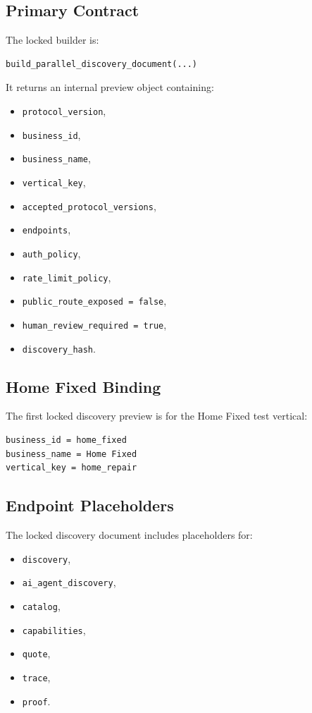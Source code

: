 \subsection{Primary Contract}

The locked builder is:

\begin{verbatim}
build_parallel_discovery_document(...)
\end{verbatim}

It returns an internal preview object containing:

\begin{itemize}
  \item \texttt{protocol\_version},
  \item \texttt{business\_id},
  \item \texttt{business\_name},
  \item \texttt{vertical\_key},
  \item \texttt{accepted\_protocol\_versions},
  \item \texttt{endpoints},
  \item \texttt{auth\_policy},
  \item \texttt{rate\_limit\_policy},
  \item \texttt{public\_route\_exposed = false},
  \item \texttt{human\_review\_required = true},
  \item \texttt{discovery\_hash}.
\end{itemize}

\subsection{Home Fixed Binding}

The first locked discovery preview is for the Home Fixed test vertical:

\begin{verbatim}
business_id = home_fixed
business_name = Home Fixed
vertical_key = home_repair
\end{verbatim}

\subsection{Endpoint Placeholders}

The locked discovery document includes placeholders for:

\begin{itemize}
  \item \texttt{discovery},
  \item \texttt{ai\_agent\_discovery},
  \item \texttt{catalog},
  \item \texttt{capabilities},
  \item \texttt{quote},
  \item \texttt{trace},
  \item \texttt{proof}.
\end{itemize}

